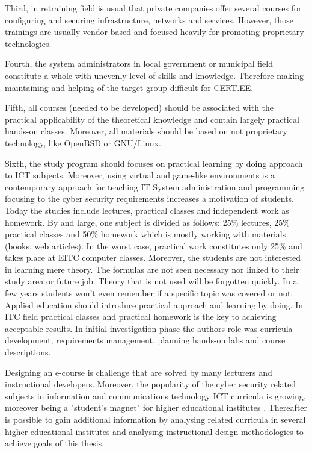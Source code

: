 Third, in retraining field is usual that private companies offer several courses for configuring and securing infrastructure, networks and services. However, those trainings are usually vendor based and focused heavily for promoting proprietary technologies.

Fourth, the system administrators in local government or municipal field constitute a whole with unevenly level of skills and knowledge. Therefore making maintaining and helping of the target group difficult for \gls{CERT.EE}.


Fifth, all courses (needed to be developed) should be associated with the practical applicability of the theoretical knowledge and contain largely practical hands-on classes. Moreover, all materials should be based on not proprietary technology, like \gls{OpenBSD} or \gls{GNU/Linux}.

Sixth, the study program should focuses on practical learning by doing approach to \gls{ICT} subjects. Moreover, using virtual and game-like environments is a contemporary approach for teaching IT System administration and programming focusing to the cyber security requirements increases a motivation of students. Today the studies include lectures, practical classes and independent work as homework. By and large, one subject is divided as follows: 25\% lectures, 25\% practical classes and 50\% homework which is mostly working with materials (books, web articles). In the worst case, practical work constitutes only 25\% and takes place at \gls{EITC} computer classes.
Moreover, the students are not interested in learning mere theory. The formulas are not seen necessary nor linked to their study area or future job. Theory that is not used will be forgotten quickly. In a few years students won't even remember if a specific topic was covered or not. Applied education should introduce practical approach and learning by doing. In ITC field practical classes and practical homework is the key to achieving acceptable results.
In initial investigation phase the authors role was curricula development, requirements management,  planning hands-on labs and course descriptions.


Designing an e-course is challenge that are solved by many lecturers and instructional developers. Moreover, the popularity of the cyber security related subjects in information and communications technology ICT curricula is growing, moreover being a "student’s magnet" for higher educational institutes \citep{CyberIsHot}. Thereafter is possible to gain additional information by analysing related curricula in several higher educational institutes and analysing instructional design methodologies to achieve goals of this thesis.

